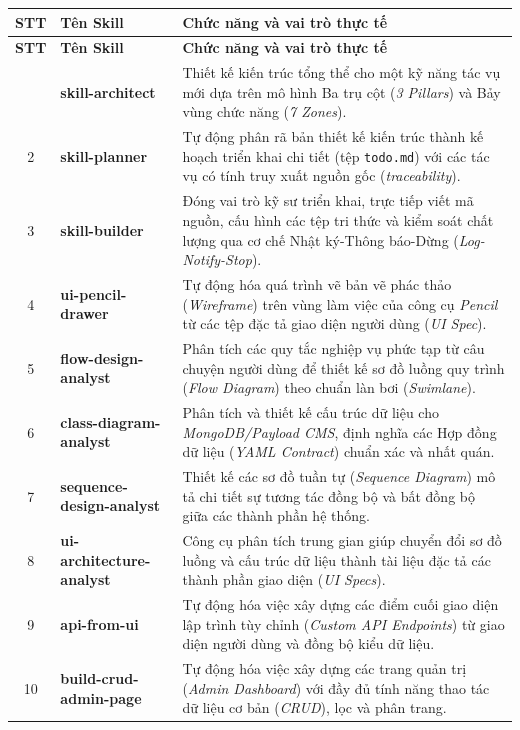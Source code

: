 \documentclass[13pt,a4paper,oneside]{extreport}
\numberwithin{equation}{chapter}
\numberwithin{figure}{chapter}
\numberwithin{table}{chapter}
\begin{document}
\begin{longtable}{|c|l|p{9cm}|}
\hline
\textbf{STT} & \textbf{Tên Skill} & \textbf{Chức năng và vai trò thực tế} \\
\hline
\endfirsthead
\hline
\textbf{STT} & \textbf{Tên Skill} & \textbf{Chức năng và vai trò thực tế} \\
\hline
\endhead
\hline
\endfoot
1 & \textbf{skill-architect} & Thiết kế kiến trúc tổng thể cho một kỹ năng tác vụ mới dựa trên mô hình Ba trụ cột (\textit{3 Pillars}) và Bảy vùng chức năng (\textit{7 Zones}). \\
\hline
2 & \textbf{skill-planner} & Tự động phân rã bản thiết kế kiến trúc thành kế hoạch triển khai chi tiết (tệp \texttt{todo.md}) với các tác vụ có tính truy xuất nguồn gốc (\textit{traceability}). \\
\hline
3 & \textbf{skill-builder} & Đóng vai trò kỹ sư triển khai, trực tiếp viết mã nguồn, cấu hình các tệp tri thức và kiểm soát chất lượng qua cơ chế Nhật ký-Thông báo-Dừng (\textit{Log-Notify-Stop}). \\
\hline
4 & \textbf{ui-pencil-drawer} & Tự động hóa quá trình vẽ bản vẽ phác thảo (\textit{Wireframe}) trên vùng làm việc của công cụ \textit{Pencil} từ các tệp đặc tả giao diện người dùng (\textit{UI Spec}). \\
\hline
5 & \textbf{flow-design-analyst} & Phân tích các quy tắc nghiệp vụ phức tạp từ câu chuyện người dùng để thiết kế sơ đồ luồng quy trình (\textit{Flow Diagram}) theo chuẩn làn bơi (\textit{Swimlane}). \\
\hline
6 & \textbf{class-diagram-analyst} & Phân tích và thiết kế cấu trúc dữ liệu cho \textit{MongoDB/Payload CMS}, định nghĩa các Hợp đồng dữ liệu (\textit{YAML Contract}) chuẩn xác và nhất quán. \\
\hline
7 & \textbf{sequence-design-analyst} & Thiết kế các sơ đồ tuần tự (\textit{Sequence Diagram}) mô tả chi tiết sự tương tác đồng bộ và bất đồng bộ giữa các thành phần hệ thống. \\
\hline
8 & \textbf{ui-architecture-analyst} & Công cụ phân tích trung gian giúp chuyển đổi sơ đồ luồng và cấu trúc dữ liệu thành tài liệu đặc tả các thành phần giao diện (\textit{UI Specs}). \\
\hline
9 & \textbf{api-from-ui} & Tự động hóa việc xây dựng các điểm cuối giao diện lập trình tùy chỉnh (\textit{Custom API Endpoints}) từ giao diện người dùng và đồng bộ kiểu dữ liệu. \\
\hline
10 & \textbf{build-crud-admin-page} & Tự động hóa việc xây dựng các trang quản trị (\textit{Admin Dashboard}) với đầy đủ tính năng thao tác dữ liệu cơ bản (\textit{CRUD}), lọc và phân trang. \\
\hline
\end{longtable}
\end{document}
